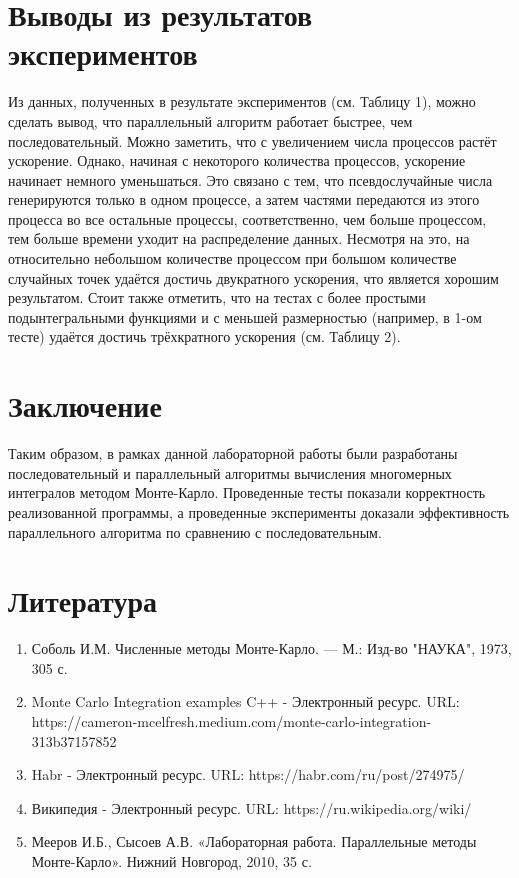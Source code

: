 \documentclass{report}
\begin{document}
\section*{Выводы из результатов экспериментов}
Из данных, полученных в результате экспериментов (см. Таблицу 1), можно сделать вывод, что параллельный алгоритм работает быстрее, чем последовательный. Можно заметить, что с увеличением числа процессов растёт ускорение. Однако, начиная с некоторого количества процессов, ускорение начинает немного уменьшаться. Это связано с тем, что псевдослучайные числа генерируются только в одном процессе, а затем частями передаются из этого процесса во все остальные процессы, соответственно, чем больше процессом, тем больше времени уходит на распределение данных. Несмотря на это, на относительно небольшом количестве процессом при большом количестве случайных точек удаётся достичь двукратного ускорения, что является хорошим результатом. Стоит также отметить, что на тестах с более простыми подынтегральными функциями и с меньшей размерностью (например, в 1-ом тесте) удаётся достичь трёхкратного ускорения (см. Таблицу 2).

\newpage

\section*{Заключение}
Таким образом, в рамках данной лабораторной работы были разработаны последовательный и параллельный алгоритмы вычисления многомерных интегралов методом Монте-Карло. Проведенные тесты показали корректность реализованной программы, а проведенные эксперименты доказали эффективность параллельного алгоритма по сравнению с последовательным.
\newpage

\section*{Литература}
\begin{enumerate}
\item Соболь И.М. Численные методы Монте-Карло. — М.: Изд-во "НАУКА", 1973, 305 с.
\item Monte Carlo Integration examples C++ - Электронный ресурс. \newline URL: https://cameron-mcelfresh.medium.com/monte-carlo-integration-313b37157852
\item Habr - Электронный ресурс. URL: https://habr.com/ru/post/274975/
\item Википедия - Электронный ресурс. URL: https://ru.wikipedia.org/wiki/%
\item Мееров И.Б., Сысоев А.В. «Лабораторная работа. Параллельные методы Монте-Карло». Нижний Новгород, 2010, 35 с. 
\end{enumerate} 
\newpage
\end{document}
